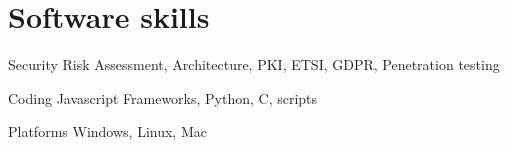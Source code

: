 \documentclass{tccv}
\begin{document}


\section{Software skills}

\begin{factlist}

\item{Security}
     {Risk Assessment, Architecture, PKI, ETSI, GDPR, Penetration testing}

\item{Coding}
     {Javascript Frameworks, Python, C, scripts }

\item{Platforms}
     {Windows, Linux, Mac}

\end{factlist}
\end{document}
